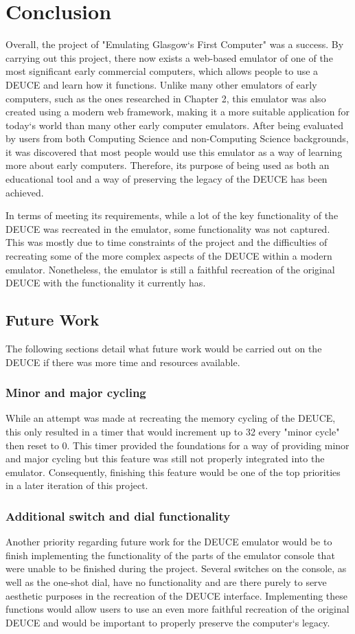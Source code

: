 \documentclass{l4proj}
\begin{document}
\chapter{Conclusion}    
Overall, the project of "Emulating Glasgow`s First Computer" was a success. By carrying out this project, there now exists a web-based emulator of one of the most significant early commercial computers, which allows people to use a DEUCE and learn how it functions. Unlike many other emulators of early computers, such as the ones researched in Chapter 2, this emulator was also created using a modern web framework, making it a more suitable application for today`s world than many other early computer emulators. After being evaluated by users from both Computing Science and non-Computing Science backgrounds, it was discovered that most people would use this emulator as a way of learning more about early computers. Therefore, its purpose of being used as both an educational tool and a way of preserving the legacy of the DEUCE has been achieved. 

In terms of meeting its requirements, while a lot of the key functionality of the DEUCE was recreated in the emulator, some functionality was not captured. This was mostly due to time constraints of the project and the difficulties of recreating some of the more complex aspects of the DEUCE within a modern emulator. Nonetheless, the emulator is still a faithful recreation of the original DEUCE with the functionality it currently has.

\section{Future Work}
The following sections detail what future work would be carried out on the DEUCE if there was more time and resources available.

\subsection{Minor and major cycling}
While an attempt was made at recreating the memory cycling of the DEUCE, this only resulted in a timer that would increment up to 32 every "minor cycle" then reset to 0. This timer provided the foundations for a way of providing minor and major cycling but this feature was still not properly integrated into the emulator. Consequently, finishing this feature would be one of the top priorities in a later iteration of this project.

\subsection{Additional switch and dial functionality}
Another priority regarding future work for the DEUCE emulator would be to finish implementing the functionality of the parts of the emulator console that were unable to be finished during the project. Several switches on the console, as well as the one-shot dial, have no functionality and are there purely to serve aesthetic purposes in the recreation of the DEUCE interface. Implementing these functions would allow users to use an even more faithful recreation of the original DEUCE and would be important to properly preserve the computer`s legacy.
\end{document}
